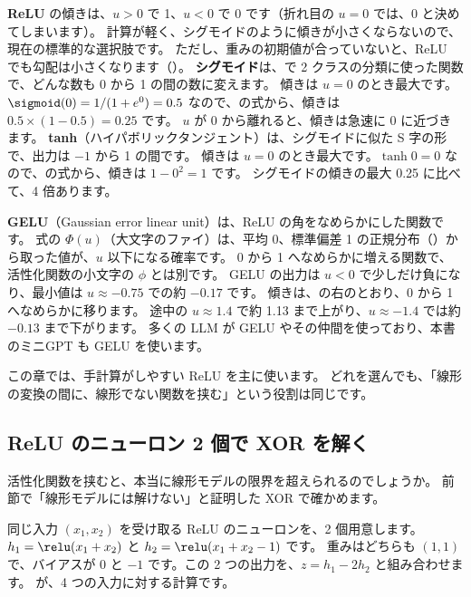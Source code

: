 \textbf{ReLU} の傾きは、$u>0$ で 1、$u<0$ で 0 です（折れ目の $u=0$ では、0 と決めてしまいます）。
計算が軽く、シグモイドのように傾きが小さくならないので、現在の標準的な選択肢です。
ただし、重みの初期値が合っていないと、ReLU でも勾配は小さくなります（）。
\textbf{シグモイド}は、で 2 クラスの分類に使った関数で、どんな数も 0 から 1 の間の数に変えます。
傾きは $u=0$ のとき最大です。$\sigmoid(0)=1/(1+e^{0})=0.5$ なので、の式から、傾きは $0.5\times(1-0.5)=0.25$ です。
$u$ が 0 から離れると、傾きは急速に 0 に近づきます。
\textbf{tanh}（ハイパボリックタンジェント）は、シグモイドに似た S 字の形で、出力は $-1$ から 1 の間です。
傾きは $u=0$ のとき最大です。$\tanh 0=0$ なので、の式から、傾きは $1-0^{2}=1$ です。
シグモイドの傾きの最大 0.25 に比べて、4 倍あります。

\textbf{GELU}（Gaussian error linear unit）\cite{hendrycks2016gelu}は、ReLU の角をなめらかにした関数です。
式の $\Phi(u)$（大文字のファイ）は、平均 0、標準偏差 1 の正規分布（）から取った値が、$u$ 以下になる確率です。
0 から 1 へなめらかに増える関数で、活性化関数の小文字の $\phi$ とは別です。
GELU の出力は $u<0$ で少しだけ負になり、最小値は $u\approx-0.75$ での約 $-0.17$ です。
傾きは、の右のとおり、0 から 1 へなめらかに移ります。
途中の $u\approx1.4$ で約 1.13 まで上がり、$u\approx-1.4$ では約 $-0.13$ まで下がります。
多くの LLM が GELU やその仲間を使っており、本書のミニGPT も GELU を使います。

この章では、手計算がしやすい ReLU を主に使います。
どれを選んでも、「線形の変換の間に、線形でない関数を挟む」という役割は同じです。

\subsection*{ReLU のニューロン 2 個で XOR を解く}

活性化関数を挟むと、本当に線形モデルの限界を超えられるのでしょうか。
前節で「線形モデルには解けない」と証明した XOR で確かめます。

同じ入力 $(x_1,x_2)$ を受け取る ReLU のニューロンを、2 個用意します。
$h_1=\relu(x_1+x_2)$ と $h_2=\relu(x_1+x_2-1)$ です。
重みはどちらも $(1,1)$ で、バイアスが 0 と $-1$ です。この 2 つの出力を、$z=h_1-2h_2$ と組み合わせます。
が、4 つの入力に対する計算です。

